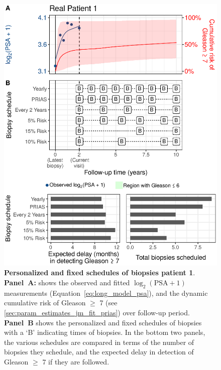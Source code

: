 \begin{figure}
\centerline{\includegraphics[width=\columnwidth]{images/demo_pat1_supp.eps}}
\caption{\textbf{Personalized and fixed schedules of biopsies patient 1}. \textbf{Panel~A:} shows the observed and fitted $\log_2(\mbox{PSA} + 1)$ measurements (Equation~\ref{eq:long_model_psa}), and the dynamic cumulative risk of Gleason $\geq$ 7 (see \ref{sec:param_estimates_jm_fit_prias}) over follow-up period. \textbf{Panel~B} shows the personalized and fixed schedules of biopsies with a `B' indicating times of biopsies. In the bottom two panels, the various schedules are compared in terms of the number of biopsies they schedule, and the expected delay in detection of Gleason $\geq$ 7 if they are followed.}
\label{fig:demo_pat1_supp}
\end{figure}

